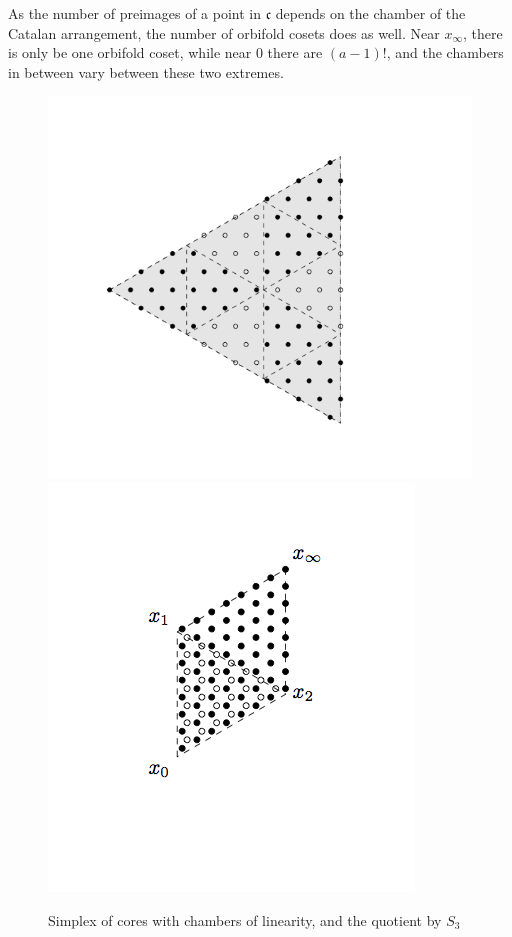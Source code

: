 \documentclass{amsart}[12pt]
\theoremstyle{definition}
\newcommand{\polyh}{\mathfrak{c}}
\begin{document}
As the number of preimages of a point in $\polyh$ depends on the chamber of the Catalan arrangement, the number of orbifold cosets does as well. Near $x_{\infty}$, there is only be one orbifold coset, while near $0$ there are $(a-1)!$, and the chambers in between vary between these two extremes.   

\begin{figure}
\caption{Simplex of cores with chambers of linearity, and the quotient by $S_3$}
\label{fig-quotient}
\includegraphics{chamberspic.png}
\includegraphics{quotientpic.png}
\end{figure}
\end{document}
